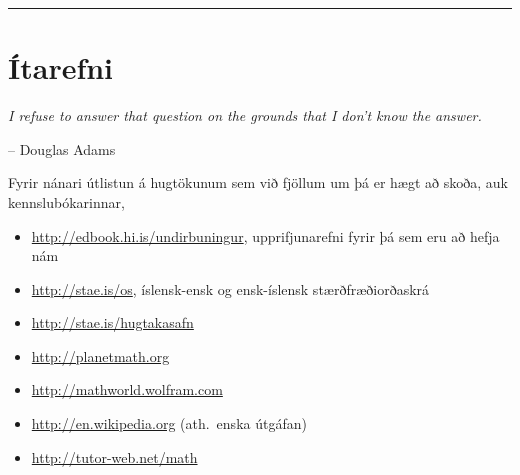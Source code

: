 \documentclass[b5paper,10pt,icelandic]{sphinxmanual}
\begin{document}
\bigskip\hrule{}\bigskip

\newpage

\section{Ítarefni}
\label{vidauki:itarefni}
\emph{I refuse to answer that question on the grounds that I don't know the answer.}

-- Douglas Adams

Fyrir nánari útlistun á hugtökunum sem við fjöllum um þá er hægt að skoða,
auk kennslubókarinnar,
\begin{itemize}
\item {} 
\href{http://edbook.hi.is/undirbuningur}{http://edbook.hi.is/undirbuningur}, upprifjunarefni fyrir þá sem eru að hefja nám

\item {} 
\href{http://stae.is/os}{http://stae.is/os}, íslensk-ensk og ensk-íslensk stærðfræðiorðaskrá

\item {} 
\href{http://stae.is/hugtakasafn}{http://stae.is/hugtakasafn}

\item {} 
\href{http://planetmath.org}{http://planetmath.org}

\item {} 
\href{http://mathworld.wolfram.com}{http://mathworld.wolfram.com}

\item {} 
\href{http://en.wikipedia.org}{http://en.wikipedia.org} (ath. enska útgáfan)

\item {} 
\href{http://tutor-web.net/math}{http://tutor-web.net/math}

\end{itemize}
\end{document}
